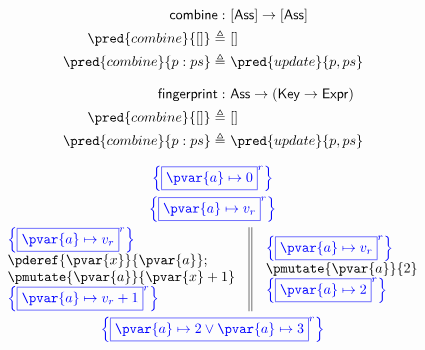 \begin{align*}
\mathsf{combine} :&\ [\mathsf{Ass}] \rightarrow [\mathsf{Ass}] \\
\pred{combine}{[]} \triangleq&\ [] \\
\pred{combine}{p : ps} \triangleq&\ \pred{update}{p, ps}
\end{align*}

\begin{align*}
\mathsf{fingerprint} :&\ \mathsf{Ass} \rightarrow (\mathsf{Key} \rightarrow \mathsf{Expr}) \\
\pred{combine}{[]} \triangleq&\ [] \\
\pred{combine}{p : ps} \triangleq&\ \pred{update}{p, ps}
\end{align*}

\iftrue
\begin{gather*}
\color{blue} \left\lbrace \boxed{\pvar{a} \mapsto 0}^r \right\rbrace \\
\color{blue} \left\lbrace \boxed{\pvar{a} \mapsto v_r}^r \right\rbrace \\
\begin{array}{c || c}
\begin{array}{l}
\color{blue} \left\lbrace \boxed{\pvar{a} \mapsto v_r}^r \right\rbrace \\
\pderef{\pvar{x}}{\pvar{a}}; \\
\pmutate{\pvar{a}}{\pvar{x} + 1} \\
\color{blue} \left\lbrace \boxed{\pvar{a} \mapsto v_r + 1}^r \right\rbrace
\end{array}
&
\begin{array}{l}
\color{blue} \left\lbrace \boxed{\pvar{a} \mapsto v_r}^r \right\rbrace \\
\pmutate{\pvar{a}}{2} \\
\color{blue} \left\lbrace \boxed{\pvar{a} \mapsto 2}^r \right\rbrace
\end{array}
\end{array} \\
\color{blue} \left\lbrace \boxed{\pvar{a} \mapsto 2 \lor \pvar{a} \mapsto 3}^r \right\rbrace
\end{gather*}

